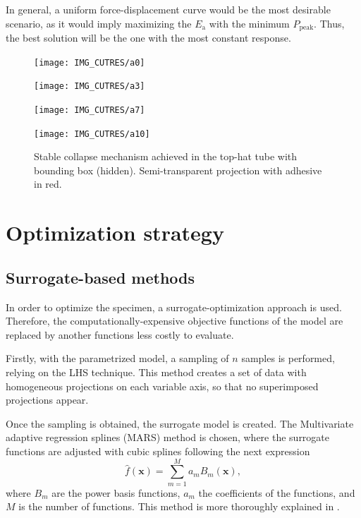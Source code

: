 \documentclass[cmfonts]{witpress}
\begin{document}
In general, a uniform force-displacement curve would be the most desirable scenario, as it would imply maximizing the $E_\text{a}$  with the minimum $P_\text{peak}$. Thus, the best solution will be the one with the most constant response.

\begin{figure}
	\centering
	\begin{minipage}[b]{.15\linewidth}
		\centering
		\texttt{[image: IMG\_CUTRES/a0]}
	\end{minipage}
	\hfill
	\begin{minipage}[b]{.15\linewidth}
		\centering
		\texttt{[image: IMG\_CUTRES/a3]}
	\end{minipage}
	\hfill
	\begin{minipage}[b]{.15\linewidth}
		\centering
		\texttt{[image: IMG\_CUTRES/a7]}
	\end{minipage}
	\hfill
	\begin{minipage}[b]{.15\linewidth}
		\centering
		\texttt{[image: IMG\_CUTRES/a10]}
	\end{minipage}
	\caption[Stable collapse mechanism achieved in the top-hat tube with bounding box.]{Stable collapse mechanism achieved in the top-hat tube with bounding box (hidden). Semi-transparent projection with adhesive in red.}
	\label{fig:stable}
\end{figure}


\section{Optimization strategy}

\subsection{Surrogate-based methods}

In order to optimize the specimen, a surrogate-optimization approach is used. Therefore, the computationally-expensive  objective functions of the model are replaced by another functions less costly to evaluate. 

Firstly, with the parametrized model, a sampling of $n$ samples is performed, relying on the LHS technique. This method creates a set of data with homogeneous projections on each variable axis, so that no superimposed projections appear. 

Once the sampling is obtained, the surrogate model is created. The Multivariate adaptive regression splines (MARS) method is chosen, where the surrogate functions are adjusted with cubic splines following the next expression
\begin{equation}\label{eq:mars}
\hat{f}\left ( \bm{x} \right )= \sum_{m=1}^{M}a_{m}B_{m}\left ( \bm{x} \right ),
\end{equation}
where $B_{m}$ are the power basis functions, $a_{m}$ the coefficients of the functions, and $M$ is the number of functions. This method is more thoroughly explained in \cite{Friedman1995197}. 
\end{document}
